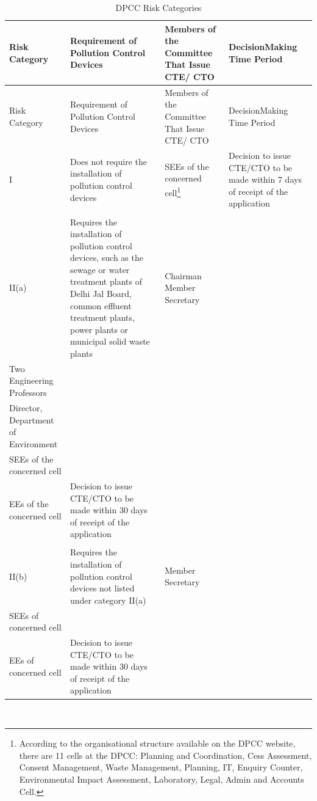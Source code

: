 \documentclass[a4paper, 12pt]{article}
\newcommand\tabitem{\makebox[1em][r]{\textbullet~}}
\begin{document}

\begin{longtable}{>{\raggedright}p{2cm}>{\raggedright}p{4cm}>{\raggedright}p{4cm}>{\raggedright\arraybackslash}p{4cm}}
\caption{DPCC Risk Categories} \\
Risk Category & Requirement of Pollution Control Devices & Members of the Committee That Issue CTE/ CTO & DecisionMaking Time Period \\
\midrule
\endfirsthead
Risk Category & Requirement of Pollution Control Devices & Members of the Committee That Issue CTE/ CTO & DecisionMaking Time Period \\
\midrule
\endhead
\endfoot
\endlastfoot

I & Does not require the installation of pollution control devices & SEEs of the concerned cell\footnote{According to the organisational structure available on the DPCC website, there are 11 cells at the DPCC: Planning and Coordination, Cess Assessment, Consent Management, Waste Management, Planning, IT, Enquiry Counter, Environmental Impact Assessment, Laboratory, Legal, Admin and Accounts Cell.} & Decision to issue CTE/CTO to be made within 7 days of receipt of the application \\
 & & &  \\
II(a) & Requires the installation of pollution control devices, such as the sewage or water treatment plants of Delhi Jal Board, common effluent treatment plants, power plants or municipal solid waste plants & \tabitem Chairman  \tabitem Member Secretary \\  \tabitem Two Engineering Professors \\ \tabitem Director, Department of Environment \\ \tabitem SEEs of the concerned cell \\ \tabitem EEs of the concerned cell 
 & Decision to issue CTE/CTO to be made within 30 days of receipt of the application \\
  & & & \\
II(b) & Requires the installation of pollution control devices not listed under category II(a) & \tabitem Member Secretary \\ \tabitem SEEs of concerned cell \\ \tabitem  EEs of concerned cell & Decision to issue CTE/CTO to be made within 30 days of receipt of the application \\

\end{longtable}
\small{\textit{\parencite{DPCC17}}} \\
         
\end{document}
